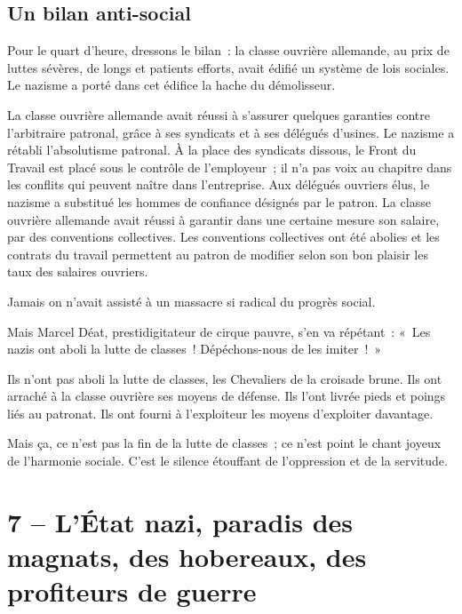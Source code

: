 \documentclass[french,twoside]{book} %
\newcommand\chapteropen{} %
\newcommand\chapterclose{} %
\begin{document}
\section[{Un bilan anti-social}]{Un bilan anti-social}
\noindent Pour le quart d’heure, dressons le bilan : la classe ouvrière allemande, au prix de luttes sévères, de longs et patients efforts, avait édifié un système de lois sociales. Le nazisme a porté dans cet édifice la hache du démolisseur.\par
La classe ouvrière allemande avait réussi à s’assurer quelques garanties contre l’arbitraire patronal, grâce à ses syndicats et à ses délégués d’usines. Le nazisme a rétabli l’absolutisme patronal. À la place des syndicats dissous, le Front du Travail est placé sous le contrôle de l’employeur ; il n’a pas voix au chapitre dans les conflits qui peuvent naître dans l’entreprise. Aux délégués ouvriers élus, le nazisme a substitué les hommes de confiance désignés par le patron. La classe ouvrière allemande avait réussi à garantir dans une certaine mesure son salaire, par des conventions collectives. Les conventions collectives ont été abolies et les contrats du travail permettent au patron de modifier selon son bon plaisir les taux des salaires ouvriers.\par
Jamais on n’avait assisté à un massacre si radical du progrès social.\par
Mais Marcel Déat, prestidigitateur de cirque pauvre, s’en va répétant : « Les nazis ont aboli la lutte de classes ! Dépéchons-nous de les imiter ! »\par
Ils n’ont pas aboli la lutte de classes, les Chevaliers de la croisade brune. Ils ont arraché à la classe ouvrière ses moyens de défense. Ils l’ont livrée pieds et poings liés au patronat. Ils ont fourni à l’exploiteur les moyens d’exploiter davantage.\par
Mais ça, ce n’est pas la fin de la lutte de classes ; ce n’est point le chant joyeux de l’harmonie sociale. C’est le silence étouffant de l’oppression et de la servitude.
\chapterclose


\chapteropen
\chapter[{7 – L’État nazi, paradis des magnats, des hobereaux, des profiteurs de guerre}]{7 – L’État nazi, paradis des magnats, des hobereaux, des profiteurs de guerre}\renewcommand{\leftmark}{7 – L’État nazi, paradis des magnats, des hobereaux, des profiteurs de guerre}
\end{document}
